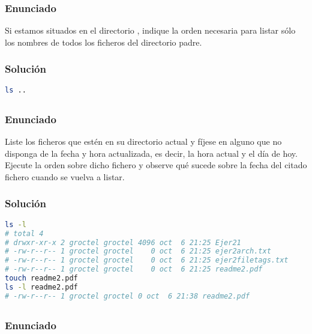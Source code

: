 \subsubsection{Enunciado}

Si estamos situados en el directorio , indique la orden necesaria para listar sólo los nombres de todos los ficheros del directorio padre.

\subsubsection{Solución}

\begin{lstlisting}[language=sh]
ls ..
\end{lstlisting}

\subsection{}\label{ej1-4}

\subsubsection{Enunciado}

Liste los ficheros que estén en su directorio actual y fíjese en alguno que no disponga de la fecha y hora actualizada, es decir, la hora actual y el día de hoy.
Ejecute la orden  sobre dicho fichero y observe qué sucede sobre la fecha del citado fichero cuando se vuelva a listar.

\subsubsection{Solución}

\begin{lstlisting}[language=sh]
ls -l
# total 4
# drwxr-xr-x 2 groctel groctel 4096 oct  6 21:25 Ejer21
# -rw-r--r-- 1 groctel groctel    0 oct  6 21:25 ejer2arch.txt
# -rw-r--r-- 1 groctel groctel    0 oct  6 21:25 ejer2filetags.txt
# -rw-r--r-- 1 groctel groctel    0 oct  6 21:25 readme2.pdf
touch readme2.pdf
ls -l readme2.pdf
# -rw-r--r-- 1 groctel groctel 0 oct  6 21:38 readme2.pdf
\end{lstlisting}

\subsection{}\label{ej1-5}

\subsubsection{Enunciado}

